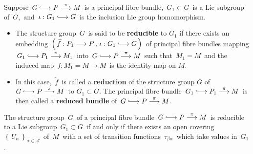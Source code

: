
\vskip 0.5cm
\begin{definition}
\mbox{}
\vskip 0.2cm
\noindent
Suppose
\,$G \longhookrightarrow P \overset{\pi}{\longrightarrow} M$\,
is a principal fibre bundle,
\,$G_{1} \subset G$\, is a Lie subgroup of \,$G$,\, and
\,$\iota:G_{1}\longhookrightarrow G$\,
is the inclusion Lie group homomorphism.
\begin{itemize}
\item
	\vskip -0.2cm
	The structure group \,$G$\, is said to be \textbf{reducible} to $G_{1}$
	if there exists an embedding
	\,$\left(\,\widetilde{f}:P_{1}\longrightarrow P\,,\,\iota:G_{1}\longhookrightarrow G\,\right)$\,
	of principal fibre bundles mapping
	\,$G_{1} \longhookrightarrow P_{1} \overset{\pi}{\longrightarrow} M_{1}$\,
	into
	\,$G \longhookrightarrow P \overset{\pi}{\longrightarrow} M$\,
	such that
	\,$M_{1} = M$\,
	and the induced map
	\,$f : M_{1} = M \longrightarrow M$\,
	is the identity map on $M$.
\item
	In this case,
	\,$\widetilde{f}$\, is called a \textbf{reduction} of the structure group $G$ of
	\,$G \longhookrightarrow P \overset{\pi}{\longrightarrow} M$\,
	to $G_{1} \subset G$.
	The principal fibre bundle
	\,$G_{1} \longhookrightarrow P_{1} \overset{\pi}{\longrightarrow} M$\,
	is then called a \textbf{reduced bundle} of
	\,$G \longhookrightarrow P \overset{\pi}{\longrightarrow} M$.\,
	
\end{itemize}
\end{definition}


\vskip 0.5cm
\begin{proposition}
\mbox{}
\vskip 0.2cm
\noindent
The structure group \,$G$\, of a principal fibre bundle
\,$G \longhookrightarrow P \overset{\pi}{\longrightarrow} M$\,
is reducible to a Lie subgroup 
\,$G_{1} \subset G$\, if and only if
there exists an open covering
\,$\left\{\,U_{\alpha}\,\right\}_{\alpha\in\mathcal{A}}$\,
of \,$M$\, with a set of transition functions
\,$\tau_{\beta\alpha}$\,
which take values in \,$G_{1}$.
\end{proposition}
\proof

